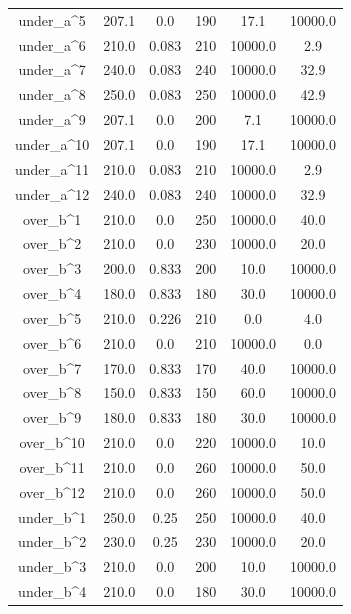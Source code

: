 \documentclass[a4paper,11pt]{article}
\begin{document}
\begin{longtable}{cccccc}
under\_a\textasciicircum{}5 & 207.1 & 0.0 & 190 & 17.1 & 10000.0\\
\addlinespace
under\_a\textasciicircum{}6 & 210.0 & 0.083 & 210 & 10000.0 & 2.9\\
under\_a\textasciicircum{}7 & 240.0 & 0.083 & 240 & 10000.0 & 32.9\\
under\_a\textasciicircum{}8 & 250.0 & 0.083 & 250 & 10000.0 & 42.9\\
under\_a\textasciicircum{}9 & 207.1 & 0.0 & 200 & 7.1 & 10000.0\\
under\_a\textasciicircum{}10 & 207.1 & 0.0 & 190 & 17.1 & 10000.0\\
\addlinespace
under\_a\textasciicircum{}11 & 210.0 & 0.083 & 210 & 10000.0 & 2.9\\
under\_a\textasciicircum{}12 & 240.0 & 0.083 & 240 & 10000.0 & 32.9\\
over\_b\textasciicircum{}1 & 210.0 & 0.0 & 250 & 10000.0 & 40.0\\
over\_b\textasciicircum{}2 & 210.0 & 0.0 & 230 & 10000.0 & 20.0\\
over\_b\textasciicircum{}3 & 200.0 & 0.833 & 200 & 10.0 & 10000.0\\
\addlinespace
over\_b\textasciicircum{}4 & 180.0 & 0.833 & 180 & 30.0 & 10000.0\\
over\_b\textasciicircum{}5 & 210.0 & 0.226 & 210 & 0.0 & 4.0\\
over\_b\textasciicircum{}6 & 210.0 & 0.0 & 210 & 10000.0 & 0.0\\
over\_b\textasciicircum{}7 & 170.0 & 0.833 & 170 & 40.0 & 10000.0\\
over\_b\textasciicircum{}8 & 150.0 & 0.833 & 150 & 60.0 & 10000.0\\
\addlinespace
over\_b\textasciicircum{}9 & 180.0 & 0.833 & 180 & 30.0 & 10000.0\\
over\_b\textasciicircum{}10 & 210.0 & 0.0 & 220 & 10000.0 & 10.0\\
over\_b\textasciicircum{}11 & 210.0 & 0.0 & 260 & 10000.0 & 50.0\\
over\_b\textasciicircum{}12 & 210.0 & 0.0 & 260 & 10000.0 & 50.0\\
under\_b\textasciicircum{}1 & 250.0 & 0.25 & 250 & 10000.0 & 40.0\\
\addlinespace
under\_b\textasciicircum{}2 & 230.0 & 0.25 & 230 & 10000.0 & 20.0\\
under\_b\textasciicircum{}3 & 210.0 & 0.0 & 200 & 10.0 & 10000.0\\
under\_b\textasciicircum{}4 & 210.0 & 0.0 & 180 & 30.0 & 10000.0\\

\end{longtable}
\end{document}

